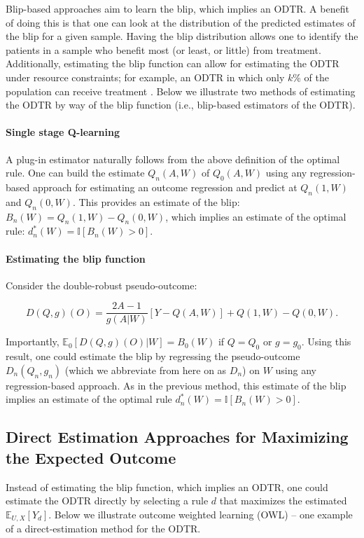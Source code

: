 \documentclass[a4paper,12pt]{article}
\begin{document}
Blip-based approaches aim to learn the blip, which implies an ODTR. A benefit of doing this is that one can look at the distribution of the predicted estimates of the blip for a given sample. Having the blip distribution allows one to identify the patients in a sample who benefit most (or least, or little) from treatment. Additionally, estimating the blip function can allow for estimating the ODTR under resource constraints; for example, an ODTR in which only $k$\% of the population can receive treatment \citep{luedtke2016optimal}. Below we illustrate two methods of estimating the ODTR by way of the blip function (i.e., blip-based estimators of the ODTR).

\paragraph{Single stage Q-learning}
A plug-in estimator naturally follows from the above definition of the optimal rule. One can build the estimate $Q_n(A,W)$ of $Q_0(A,W)$ using any regression-based approach for estimating an outcome regression and predict at $Q_n(1,W)$ and $Q_n(0,W)$. This provides an estimate of the blip: $B_n(W)=Q_n(1,W)-Q_n (0,W)$, which implies an estimate of the optimal rule: $d_n^*(W)=\mathbb{I}[B_n (W)>0]$. 

\paragraph{Estimating the blip function}

Consider the double-robust pseudo-outcome:

\[D(Q,g)(O)=\frac{2A-1}{g(A|W)}[Y-Q(A,W)]+Q(1,W)-Q(0,W).\]

\noindent Importantly, $\mathbb{E}_0 [D(Q,g)(O)|W]=B_0 (W)$ if  $Q=Q_0$ or $g=g_0$. Using this result, one could estimate the blip by regressing the pseudo-outcome $D_n(Q_n,g_n)$ (which we abbreviate from here on as $D_n$) on $W$ using any regression-based approach. As in the previous method, this estimate of the blip implies an estimate of the optimal rule $d_n^*(W)=\mathbb{I}[B_n (W)>0]$.

\subsection{Direct Estimation Approaches for Maximizing the Expected Outcome}

Instead of estimating the blip function, which implies an ODTR, one could estimate the ODTR directly by selecting a rule $d$ that maximizes the estimated $\mathbb{E}_{U,X}[Y_d]$. Below we illustrate outcome weighted learning (OWL) --  one example of a direct-estimation method for the ODTR.
\end{document}
